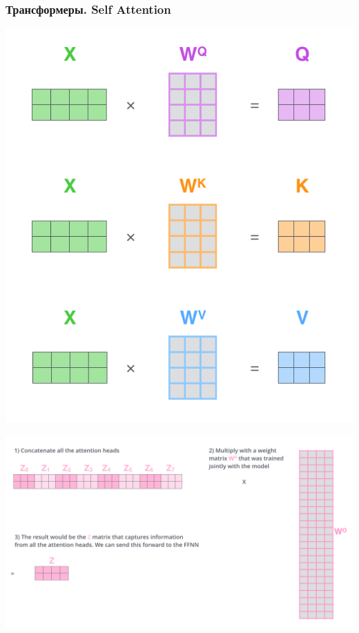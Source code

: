 \documentclass[notheorems, handout]{beamer}
\begin{document}
	\begin{frame}
	\frametitle{Трансформеры. Self Attention}
		\begin{minipage}{0.35\textwidth}
			\centering
			\includegraphics[scale=0.15]{img/self-attention.png}
		\end{minipage}\hfill
		\begin{minipage}{0.6\textwidth}
			\centering
			\includegraphics[scale=0.15]{img/multi-head-att.png}
		\end{minipage}
		\begin{figure}[H]

\end{figure}
\end{frame}
\end{document}
